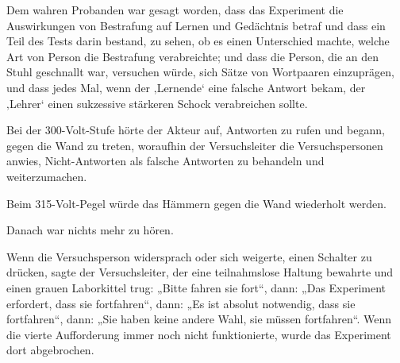 Dem wahren Probanden war gesagt worden, dass das Experiment die Auswirkungen von Bestrafung auf Lernen und Gedächtnis betraf und dass ein Teil des Tests darin bestand, zu sehen, ob es einen Unterschied machte, welche Art von Person die Bestrafung verabreichte; und dass die Person, die an den Stuhl geschnallt war, versuchen würde, sich Sätze von Wortpaaren einzuprägen, und dass jedes Mal, wenn der ‚Lernende‘ eine falsche Antwort bekam, der ‚Lehrer‘ einen sukzessive stärkeren Schock verabreichen sollte.

Bei der 300-Volt-Stufe hörte der Akteur auf, Antworten zu rufen und begann, gegen die Wand zu treten, woraufhin der Versuchsleiter die Versuchspersonen anwies, Nicht-Antworten als falsche Antworten zu behandeln und weiterzumachen.

Beim 315-Volt-Pegel würde das Hämmern gegen die Wand wiederholt werden.

Danach war nichts mehr zu hören.

Wenn die Versuchsperson widersprach oder sich weigerte, einen Schalter zu drücken, sagte der Versuchsleiter, der eine teilnahmslose Haltung bewahrte und einen grauen Laborkittel trug:
„Bitte fahren sie fort“, dann:
„Das Experiment erfordert, dass sie fortfahren“, dann:
„Es ist absolut notwendig, dass sie fortfahren“, dann:
„Sie haben keine andere Wahl, sie müssen fortfahren“. Wenn die vierte Aufforderung immer noch nicht funktionierte, wurde das Experiment dort abgebrochen.

